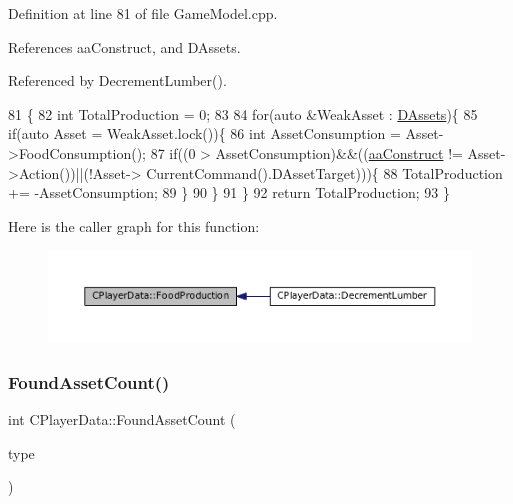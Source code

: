 Definition at line 81 of file Game\+Model.\+cpp.



References aa\+Construct, and D\+Assets.



Referenced by Decrement\+Lumber().


\begin{DoxyCode}
81                                      \{
82     \textcolor{keywordtype}{int} TotalProduction = 0;
83     
84     \textcolor{keywordflow}{for}(\textcolor{keyword}{auto} &WeakAsset : \hyperlink{classCPlayerData_a1d7dd355facf52db6242e3554373906c}{DAssets})\{
85         \textcolor{keywordflow}{if}(\textcolor{keyword}{auto} Asset = WeakAsset.lock())\{
86             \textcolor{keywordtype}{int} AssetConsumption = Asset->FoodConsumption();
87             \textcolor{keywordflow}{if}((0 > AssetConsumption)&&((\hyperlink{GameDataTypes_8h_ab47668e651a3032cfb9c40ea2d60d670a7ef6b863f66dd7dcc95a199cd758ae1d}{aaConstruct} != Asset->Action())||(!Asset->
      CurrentCommand().DAssetTarget)))\{
88                 TotalProduction += -AssetConsumption;
89             \}
90         \}
91     \}
92     \textcolor{keywordflow}{return} TotalProduction;
93 \}
\end{DoxyCode}
Here is the caller graph for this function\+:\nopagebreak
\begin{figure}[H]
\begin{center}
\leavevmode
\includegraphics[width=350pt]{classCPlayerData_ae71ad19439d31ba0eb7f59809885ed6d_icgraph}
\end{center}
\end{figure}
\hypertarget{classCPlayerData_ac81c0899651bf3f9962b03ef0d7a2415}{}\label{classCPlayerData_ac81c0899651bf3f9962b03ef0d7a2415} 
\subsubsection{\texorpdfstring{Found\+Asset\+Count()}{FoundAssetCount()}}
{\footnotesize\ttfamily int C\+Player\+Data\+::\+Found\+Asset\+Count (\begin{DoxyParamCaption}\item[{\hyperlink{GameDataTypes_8h_a5600d4fc433b83300308921974477fec}{E\+Asset\+Type}}]{type }\end{DoxyParamCaption})}



